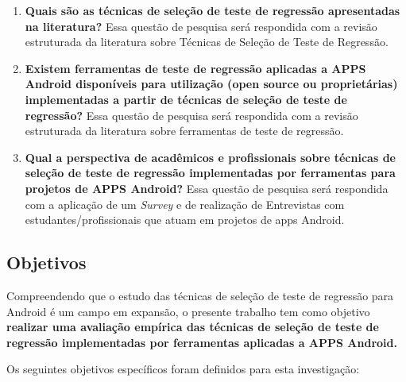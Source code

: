 \begin{enumerate}[label=\bf QP\arabic*,leftmargin=1.8cm]
    
    \item \textbf{Quais são as técnicas de seleção de teste de regressão apresentadas na literatura?} Essa questão de pesquisa será respondida com a revisão estruturada da literatura sobre Técnicas de Seleção de Teste de Regressão.
    
    \item \textbf{Existem ferramentas de teste de regressão aplicadas a \ac{APPS} Android disponíveis para utilização (open source ou proprietárias) implementadas a partir de técnicas de seleção de teste de regressão?} Essa questão de pesquisa será respondida com a revisão estruturada da literatura sobre ferramentas de teste de regressão.
    
    \item \textbf{Qual a perspectiva de acadêmicos e profissionais sobre técnicas de seleção de teste de regressão implementadas por ferramentas para projetos de \ac{APPS} Android?} Essa questão de pesquisa será respondida com a aplicação de um \textit{Survey} e de realização de Entrevistas com estudantes/profissionais que atuam em projetos de apps Android.

\end{enumerate}



\subsection{Objetivos}

Compreendendo que o estudo das técnicas de seleção de teste de regressão para Android é um campo em expansão, o presente trabalho tem como objetivo \textbf{realizar uma avaliação empírica das técnicas de seleção de teste de regressão implementadas por ferramentas aplicadas a \ac{APPS} Android.}

Os seguintes objetivos específicos foram definidos para esta investigação:

